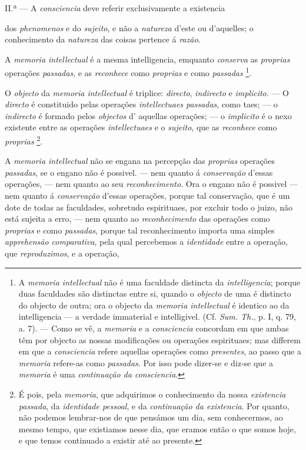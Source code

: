 II.ª --- A \emph{consciencia} deve referir exclusivamente a existencia

dos \emph{phenomenos} e do \emph{sujeito}, e não a \emph{natureza} d'este ou d'aquelles; o conhecimento da \emph{natureza} das coisas pertence á \emph{razão}.


 
A \emph{memoria intellectual} é a mesma intelligencia, emquanto \emph{conserva} as \emph{proprias} operações \emph{passadas}, e as \emph{reconhece} como \emph{proprias} e como \emph{passadas} \footnote{A \emph{memoria intellectual} não é uma faculdade distincta da \emph{intelligencia}; porque duas faculdades são distinctas entre si, quando o \emph{objecto} de uma é distincto do objecto de outra; ora o objecto da \emph{memoria intellectual} é identico ao da intelligencia --- a verdade immaterial e intelligivel. (Cf. \emph{Sum. Th.}, p. I, q. 79, a. 7). --- Como se vê, a \emph{memoria} e a \emph{consciencia} concordam em que ambas têm por objecto as nossas modificações ou operações espirituaes; mas differem em que a \emph{consciencia} refere aquellas operações como \emph{presentes}, ao passo que a \emph{memoria} refere-as como \emph{passadas}. Por isso pode dizer-se e diz-se que a \emph{memoria} é uma \emph{continuação da consciencia}.}.


O \emph{objecto} da \emph{memoria intellectual} é triplice: \emph{directo}, \emph{indirecto} e \emph{implicito}. --- O \emph{directo} é constituido pelas operações \emph{intellectuaes passadas}, como taes; --- o \emph{indirecto} é formado pelos \emph{objectos} d' aquellas operações; --- o \emph{implicito} é o nexo existente entre as operações \emph{intellectuaes} e o \emph{sujeito}, que as \emph{reconhece} como \emph{proprias} \footnote{É pois, pela \emph{memoria}, que adquirimos o conhecimento da nossa \emph{existencia passada}, da \emph{identidade pessoal}, e da \emph{continuação da existencia}. Por quanto, não podemos lembrar-nos de que pensámos um dia, sem conhecermos, ao mesmo tempo, que existiamos nesse dia, que eramos então o que somos hoje, e que temos continuado a existir até ao presente.}.


A \emph{memoria intellectual} não se engana na percepção das \emph{proprias} operações \emph{passadas}, se o engano não é possivel. --- nem quanto á \emph{conservação} d'essas operações, --- nem quanto ao seu \emph{reconhecimento}. Ora o engano não é possivel --- nem quanto á \emph{conservação} d'essas operações, porque tal conservação, que é um dote de todas as faculdades, sobretudo espirituaes, por excluir todo o juizo, não está sujeita a erro, --- nem quanto ao \emph{reconhecimento} das operações como \emph{proprias} e como \emph{passadas}, porque tal reconhecimento importa uma simples \emph{apprehensão comparativa}, pela qual percebemos a \emph{identidade} entre a operação, que \emph{reproduzimos}, e a operação,

